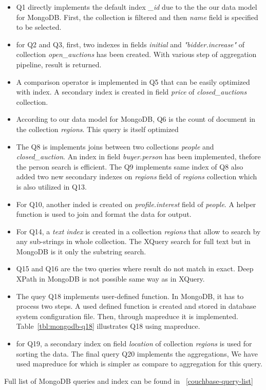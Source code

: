\begin{itemize}
\item Q1 directly implements the default index \textit{\_id} due to the the our data model for MongoDB. First, the collection is filtered and then \textit{name} field is specified to be selected. 

\item for Q2 and Q3, first, two indexes in fields \textit{initial} and \textit{"bidder.increase"} of collection \textit{open\_auctions}  has been created. With various step of aggregation pipeline, result is returned.

\item A comparison operator is implemented in Q5 that can be easily optimized with index. A secondary index is created in field \textit{price} of \textit{closed\_auctions} collection. 
\item According to our data model for MongoDB, Q6 is the count of document in the collection \textit{regions}. This query is itself optimized
\item The Q8 is implements joins between two collections \textit{people} and \textit{closed\_auction}. An index in field \textit{buyer.person} has been implemented, thefore the person search is efficient. The Q9 implements same index of Q8 also added two new secondary indexes on \textit{regions} field of \textit{regions} collection which is also utilized in Q13.
\item For Q10, another inded is created on \textit{profile.interest} field of \textit{people}. A helper function is used to join and format the data for output.
\item For Q14, a \textit{text index} is created in a collection \textit{regions} that allow to search by any sub-strings in whole collection. The XQuery search for full text but in MongoDB is it only the substring search.

\item Q15 and Q16 are the two queries where result do not match in exact. Deep XPath in MongoDB is not possible same way as in XQuery. 

\item The quey Q18 implements user-defined function. In MongoDB, it has to process two steps. A used defined function is created and stored in database system configuration file. Then, through mapreduce it is implemented. Table~\ref{tbl:mongodb-q18} illustrates Q18 using mapreduce.

\item for Q19, a secondary index on field \textit{location} of collection \textit{regions} is used for sorting the data. The final query Q20 implements the aggregations, We have used mapreduce for which is simpler as compare to aggregation for this query.

\end{itemize}
Full list of MongoDB queries and index can be found in ~\ref{couchbase-query-list}

